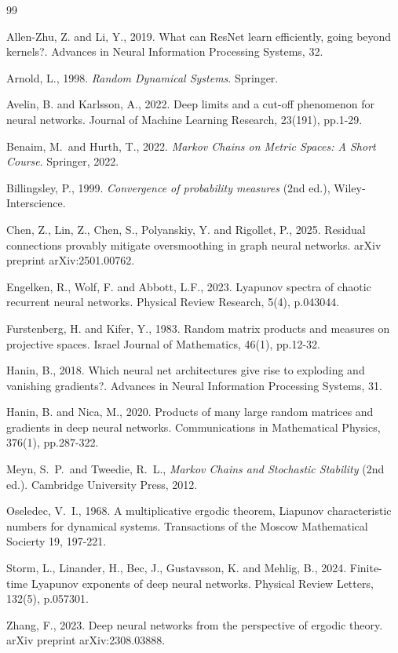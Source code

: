 \documentclass[12pt]{amsart}
\theoremstyle{plain}
\theoremstyle{definition}
\theoremstyle{remark}
\newcommand{\0}{\textbf{0}}
\begin{document}
\begin{thebibliography}{99}

 Allen-Zhu, Z. and Li, Y., 2019. What can ResNet learn efficiently, going beyond kernels?. Advances in Neural Information Processing Systems, 32.

 Arnold, L., 1998. \textit{Random Dynamical Systems}. Springer.

 Avelin, B. and Karlsson, A., 2022. Deep limits and a cut-off phenomenon for neural networks. Journal of Machine Learning Research, 23(191), pp.1-29.

 Benaim, M.\ and Hurth, T., 2022. \textit{Markov Chains on Metric Spaces: A Short Course}. Springer, 2022.

 Billingsley, P., 1999. \textit{Convergence of probability measures} (2nd ed.), Wiley-Interscience. 

 Chen, Z., Lin, Z., Chen, S., Polyanskiy, Y. and Rigollet, P., 2025. Residual connections provably mitigate oversmoothing in graph neural networks. arXiv preprint arXiv:2501.00762.

 Engelken, R., Wolf, F. and Abbott, L.F., 2023. Lyapunov spectra of chaotic recurrent neural networks. Physical Review Research, 5(4), p.043044.

 Furstenberg, H. and Kifer, Y., 1983. Random matrix products and measures on projective spaces. Israel Journal of Mathematics, 46(1), pp.12-32.


 Hanin, B., 2018. Which neural net architectures give rise to exploding and vanishing gradients?. Advances in Neural Information Processing Systems, 31.


 Hanin, B. and Nica, M., 2020. Products of many large random matrices and gradients in deep neural networks. Communications in Mathematical Physics, 376(1), pp.287-322.

 Meyn, S.\ P.\ and Tweedie, R.\ L.,  \textit{Markov Chains and Stochastic Stability} (2nd ed.). Cambridge University Press, 2012.

 Oseledec, V.\ I., 1968. A multiplicative ergodic theorem, Liapunov characteristic numbers for dynamical systems. Transactions of the Moscow Mathematical Socierty 19, 197-221.


 Storm, L., Linander, H., Bec, J., Gustavsson, K. and Mehlig, B., 2024. Finite-time Lyapunov exponents of deep neural networks. Physical Review Letters, 132(5), p.057301.

 Zhang, F., 2023. Deep neural networks from the perspective of ergodic theory. arXiv preprint arXiv:2308.03888.

\end{thebibliography}
\end{document}
